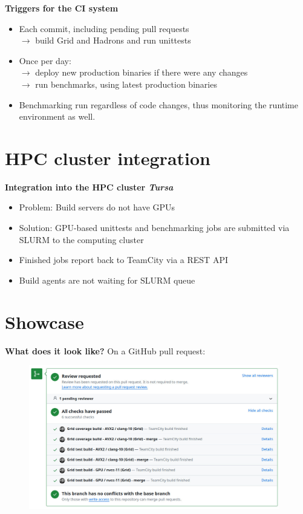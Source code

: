 \documentclass[english,xcolor=pst,11pt]{beamer}
\begin{document}
\begin{frame}
 \textbf{Triggers for the CI system}
\begin{itemize}
 \item Each commit, including pending pull requests \\$\longrightarrow$ build Grid and Hadrons and run unittests
 \item Once per day: \\$\longrightarrow$ deploy new production binaries if there were any changes \\
 $\longrightarrow$ run benchmarks, using latest production binaries
 \item Benchmarking run regardless of code changes, thus monitoring the runtime environment as well.
\end{itemize}

\end{frame}




\section{HPC cluster integration}
\begin{frame}
 \textbf{Integration into the HPC cluster \emph{Tursa}}
 \begin{itemize}
  \item Problem: Build servers do not have GPUs
  \item Solution: GPU-based unittests and benchmarking jobs are submitted via SLURM to the computing cluster
  \item Finished jobs report back to TeamCity via a REST API
  \item Build agents are not waiting for SLURM queue
 \end{itemize}

\end{frame}

\section{Showcase}
\begin{frame}
 \textbf{What does it look like?}
 On a GitHub pull request:
  \begin{figure}[H]
	\centering
    {\includegraphics[width=4.3in]{diagrams/pr.jpg}}
\end{figure}
\end{frame}
\end{document}
